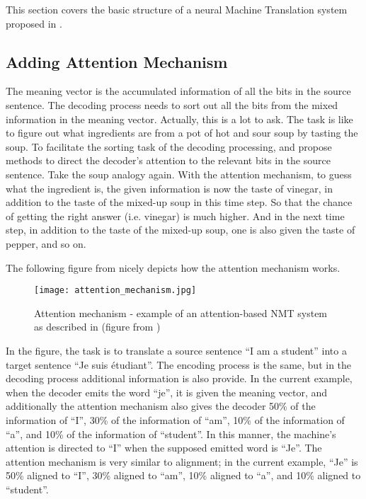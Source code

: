 This section covers the basic structure of a neural Machine Translation system proposed in \citet{cho2014properties, cho2014learning}.  


\subsection{Adding Attention Mechanism}

The meaning vector is the accumulated information of all the bits in the source sentence. The decoding process needs to sort out all the bits from the mixed information in the meaning vector. Actually, this is a lot to ask. The task is like to figure out what ingredients are from a pot of hot and sour soup by tasting the soup. To facilitate the sorting task of the decoding processing, \citet{bahdanau2014neural} and \citet{luong2015effective} propose methods to direct the decoder's attention to the relevant bits in the source sentence. Take the soup analogy again. With the attention mechanism, to guess what the ingredient is, the given information is now the taste of vinegar, in addition to the taste of the mixed-up soup in this time step. So that the chance of getting the right answer (i.e. vinegar) is much higher. And in the next time step, in addition to the taste of the mixed-up soup, one is also given the taste of pepper, and so on.   

The following figure from \citet{luong17GitHub} nicely depicts how the attention mechanism works. 

\begin{figure}[h]
\caption{Attention mechanism - example of an attention-based NMT system as described in \citet{luong2015effective} (figure from \citet{luong17GitHub})}
\centering
\texttt{[image: attention\_mechanism.jpg]}
\end{figure} 

In the figure, the task is to translate a source sentence ``I am a student'' into a target sentence ``Je suis \'{e}tudiant''.
The encoding process is the same, but in the decoding process additional information is also provide. In the current example, when the decoder emits the word ``je'', it is given the meaning vector, and additionally the attention mechanism also gives the decoder 50\% of the information of ``I'', 30\% of the information of ``am'', 10\% of the information of ``a'', and 10\% of the information of ``student''. In this manner, the machine's attention is directed to ``I'' when the supposed emitted word is ``Je''. The attention mechanism is very similar to alignment; in the current example, ``Je'' is 50\% aligned to ``I'', 30\% aligned to ``am'', 10\% aligned to ``a'', and 10\% aligned to ``student''. 

